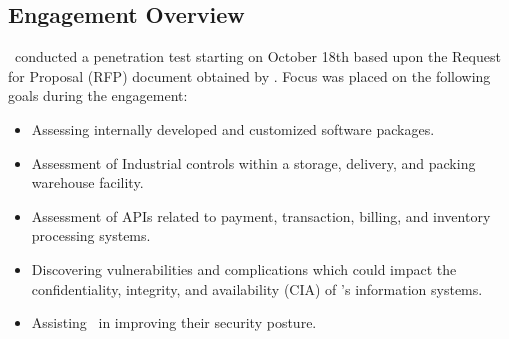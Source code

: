 \newpage
\subsection{Engagement Overview}
    \teamname\ conducted a penetration test starting on October 18th based upon the Request for Proposal (RFP) document obtained by \teamname. Focus was placed on the following goals during the engagement:
    
    \begin{itemize}
        \item Assessing internally developed and customized software packages.
        \item Assessment of Industrial controls within a storage, delivery, and packing warehouse facility.
        \item Assessment of APIs related to payment, transaction, billing, and inventory processing systems.
        \item Discovering vulnerabilities and complications which could impact the confidentiality, integrity, and availability (CIA) of \cptc's information systems.
        \item Assisting \cptc\ in improving their security posture.
        
    \end{itemize}